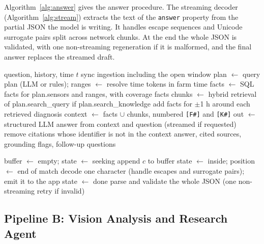 Algorithm~\ref{alg:answer} gives the answer procedure. The streaming decoder (Algorithm~\ref{alg:stream}) extracts the text of the
\texttt{answer} property from the partial JSON the model is writing. It handles escape sequences and Unicode surrogate pairs split
across network chunks. At the end the whole JSON is validated, with one non-streaming regeneration if it is malformed, and the
final answer replaces the streamed draft.

\begin{algorithm}[H]
\caption{Answer a farm question}
\label{alg:answer}
\begin{algorithmic}[1]
\Require question, history, time $t$
\State sync ingestion including the open window
\State plan $\gets$ query plan (LLM or rules); ranges $\gets$ resolve time tokens in farm time
\State facts $\gets$ SQL facts for plan.sensors and ranges, with coverage facts
\State chunks $\gets$ hybrid retrieval of plan.search\_query if plan.search\_knowledge
 \State add facts for $\pm$1 h around each retrieved diagnosis \EndIf
\State context $\gets$ facts $\cup$ chunks, numbered \texttt{[F\#]} and \texttt{[K\#]}
\State out $\gets$ structured LLM answer from context and question (streamed if requested)
\State remove citations whose identifier is not in the context
\State \Return answer, cited sources, grounding flags, follow-up questions
\end{algorithmic}
\end{algorithm}

\begin{algorithm}[H]
\caption{Incremental decoding of the answer field}
\label{alg:stream}
\begin{algorithmic}[1]
\State buffer $\gets$ empty; state $\gets$ seeking
  \State append $c$ to buffer
   \State state $\gets$ inside; position $\gets$ end of match \EndIf
    \State decode one character (handle escapes and surrogate pairs); emit it to the app
     \State state $\gets$ done \EndIf
  \EndWhile
\EndFor
\State parse and validate the whole JSON (one non-streaming retry if invalid)
\end{algorithmic}
\end{algorithm}

\subsection{Pipeline B: Vision Analysis and Research Agent}


